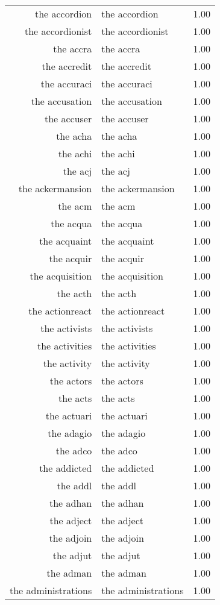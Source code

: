 \begin{table}[ht]
\begin{tabular}{rlr}
  the accordion & the accordion & 1.00 \\ 
  the accordionist & the accordionist & 1.00 \\ 
  the accra & the accra & 1.00 \\ 
  the accredit & the accredit & 1.00 \\ 
  the accuraci & the accuraci & 1.00 \\ 
  the accusation & the accusation & 1.00 \\ 
  the accuser & the accuser & 1.00 \\ 
  the acha & the acha & 1.00 \\ 
  the achi & the achi & 1.00 \\ 
  the acj & the acj & 1.00 \\ 
  the ackermansion & the ackermansion & 1.00 \\ 
  the acm & the acm & 1.00 \\ 
  the acqua & the acqua & 1.00 \\ 
  the acquaint & the acquaint & 1.00 \\ 
  the acquir & the acquir & 1.00 \\ 
  the acquisition & the acquisition & 1.00 \\ 
  the acth & the acth & 1.00 \\ 
  the actionreact & the actionreact & 1.00 \\ 
  the activists & the activists & 1.00 \\ 
  the activities & the activities & 1.00 \\ 
  the activity & the activity & 1.00 \\ 
  the actors & the actors & 1.00 \\ 
  the acts & the acts & 1.00 \\ 
  the actuari & the actuari & 1.00 \\ 
  the adagio & the adagio & 1.00 \\ 
  the adco & the adco & 1.00 \\ 
  the addicted & the addicted & 1.00 \\ 
  the addl & the addl & 1.00 \\ 
  the adhan & the adhan & 1.00 \\ 
  the adject & the adject & 1.00 \\ 
  the adjoin & the adjoin & 1.00 \\ 
  the adjut & the adjut & 1.00 \\ 
  the adman & the adman & 1.00 \\ 
  the administrations & the administrations & 1.00 \\ 

\end{tabular}
\end{table}
